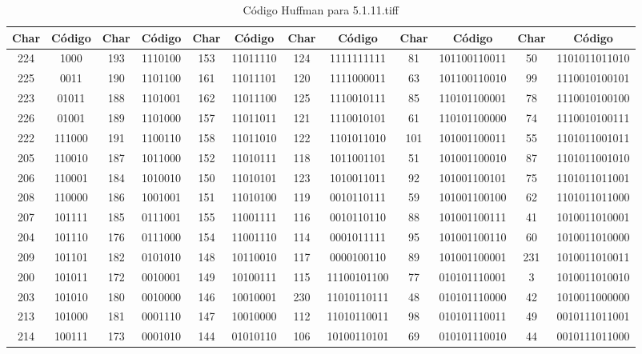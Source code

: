 \documentclass[conference,onecolumn,12pt]{IEEEtran}
\numberwithin{equation}{subsection}
\begin{document}
\begin{itemize}
    \begin{table}[H]
\centering
\caption{Código Huffman para 5.1.11.tiff}
\label{tab:huffman_5.1.11.tiff}
\scriptsize
\begin{tabular}{cccccccccccc}
\toprule
\textbf{Char} & \textbf{Código} & \textbf{Char} & \textbf{Código} & \textbf{Char} & \textbf{Código} & \textbf{Char} & \textbf{Código} & \textbf{Char} & \textbf{Código} & \textbf{Char} & \textbf{Código} \\
\midrule
224 & 1000 & 193 & 1110100 & 153 & 11011110 & 124 & 1111111111 & 81 & 101100110011 & 50 & 1101011011010 \\
225 & 0011 & 190 & 1101100 & 161 & 11011101 & 120 & 1111000011 & 63 & 101100110010 & 99 & 1110010100101 \\
223 & 01011 & 188 & 1101001 & 162 & 11011100 & 125 & 1110010111 & 85 & 110101100001 & 78 & 1110010100100 \\
226 & 01001 & 189 & 1101000 & 157 & 11011011 & 121 & 1110010101 & 61 & 110101100000 & 74 & 1110010100111 \\
222 & 111000 & 191 & 1100110 & 158 & 11011010 & 122 & 1101011010 & 101 & 101001100011 & 55 & 1101011001011 \\
205 & 110010 & 187 & 1011000 & 152 & 11010111 & 118 & 1011001101 & 51 & 101001100010 & 87 & 1101011001010 \\
206 & 110001 & 184 & 1010010 & 150 & 11010101 & 123 & 1010011011 & 92 & 101001100101 & 75 & 1101011011001 \\
208 & 110000 & 186 & 1001001 & 151 & 11010100 & 119 & 0010110111 & 59 & 101001100100 & 62 & 1101011011000 \\
207 & 101111 & 185 & 0111001 & 155 & 11001111 & 116 & 0010110110 & 88 & 101001100111 & 41 & 1010011010001 \\
204 & 101110 & 176 & 0111000 & 154 & 11001110 & 114 & 0001011111 & 95 & 101001100110 & 60 & 1010011010000 \\
209 & 101101 & 182 & 0101010 & 148 & 10110010 & 117 & 0000100110 & 89 & 101001100001 & 231 & 1010011010011 \\
200 & 101011 & 172 & 0010001 & 149 & 10100111 & 115 & 11100101100 & 77 & 010101110001 & 3 & 1010011010010 \\
203 & 101010 & 180 & 0010000 & 146 & 10010001 & 230 & 11010110111 & 48 & 010101110000 & 42 & 1010011000000 \\
213 & 101000 & 181 & 0001110 & 147 & 10010000 & 112 & 11010110011 & 98 & 010101110011 & 49 & 0010111011001 \\
214 & 100111 & 173 & 0001010 & 144 & 01010110 & 106 & 10100110101 & 69 & 010101110010 & 44 & 0010111011000 \\

\end{tabular}
\end{table}
\end{itemize}
\end{document}
